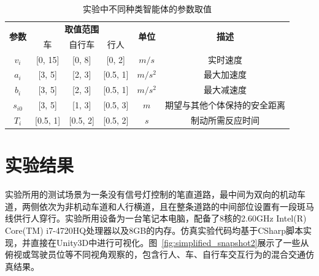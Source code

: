 \begin{table}[!htb]
\setlength{\belowcaptionskip}{0.4cm}
\begin{center}
\caption[实验中不同种类智能体的参数取值]{实验中不同种类智能体的参数取值}
\label{tab:simplified_pvalues}
\renewcommand\arraystretch{1.2}
\begin{tabular}{|c|ccc|c|c|}
\hline
\multirow{2}{*}{\textbf{参数}} & \multicolumn{3}{c|}{\textbf{取值范围}} & \multirow{2}{*}{\textbf{单位}} & \multirow{2}{*}{\textbf{描述}} \\ \cline{2-4}
 & \multicolumn{1}{c|}{车} & \multicolumn{1}{c|}{自行车} & \multicolumn{1}{c|}{行人} &  &  \\ \hline
$v_i$ & \multicolumn{1}{c|}{[0, 15]} & \multicolumn{1}{c|}{[0, 8]} & [0, 2] & $m/s$ & 实时速度 \\ \hline
$a_i$ & \multicolumn{1}{c|}{[3, 5]} & \multicolumn{1}{c|}{[2, 3]} & [0.5, 1] & $m/s^2$ & 最大加速度 \\ \hline
$b_i$ & \multicolumn{1}{c|}{[3, 5]} & \multicolumn{1}{c|}{[2, 3]} & [0.5, 1] & $m/s^2$ & 最大减速度 \\ \hline
$s_{i0}$ & \multicolumn{1}{c|}{[3, 5]} & \multicolumn{1}{c|}{[1, 3]} & [0.5, 3] & $m$ & 期望与其他个体保持的安全距离 \\ \hline
$T_i$ & \multicolumn{1}{c|}{[0.5, 1]} & \multicolumn{1}{c|}{[0.5, 2]} & [0.5, 2] & $s$ & 制动所需反应时间 \\ \hline
\end{tabular}
\end{center}{}
\end{table}


\section{实验结果}

实验所用的测试场景为一条没有信号灯控制的笔直道路，最中间为双向的机动车道，两侧依次为非机动车道和人行横道，且在整条道路的中间部位设置有一段斑马线供行人穿行。实验所用设备为一台笔记本电脑，配备了8核的2.60GHz Intel(R) Core(TM) i7-4720HQ处理器以及8GB的内存。仿真实验代码均基于CSharp脚本实现，并直接在Unity3D中进行可视化。图~\ref{fig:simplified_snapshot2}展示了一些从俯视或驾驶员位等不同视角观察的，包含行人、车、自行车交互行为的混合交通仿真结果。


